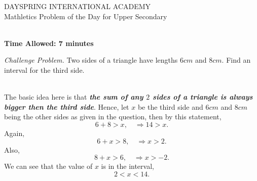 \documentclass[addpoints,12pt]{exam}
\begin{document}
\begin{center}\centering
    {\large DAYSPRING INTERNATIONAL ACADEMY}\\
    Mathletics Problem of the Day for Upper Secondary\\
\end{center}

\begin{center}
\end{center}
\vspace{0.3in}
\vspace*{0.2in}
\\
\textbf{Time Allowed: 7 minutes}

\begin{questions}
 \question \emph{Challenge Problem.} Two sides of a triangle have lengths $6cm$ and 
$8cm$. Find an interval for the third side.
	\ifprintanswers
	  \begin{solution}\\
		The basic idea here is that \textbf{\emph{the sum of any $2$ sides of a \textbf{triangle} 
is \textbf{always bigger} then the third side}}. Hence, let $x$ be the third side and $6cm$ and 
$8cm$ being the other sides as given in the question, then by this statement, $$6+8>x, \quad 
\Rightarrow 14>x.$$ Again,
$$6+x>8, \quad \Rightarrow x > 2.$$ Also, $$8+x>6, \quad \Rightarrow x>-2.$$ We can see that the 
value of $x$ is in the interval, $$2<x<14.$$
	  \end{solution}
	\else
	  \makeemptybox{5.7in}
	\fi
\end{questions}
\end{document}
